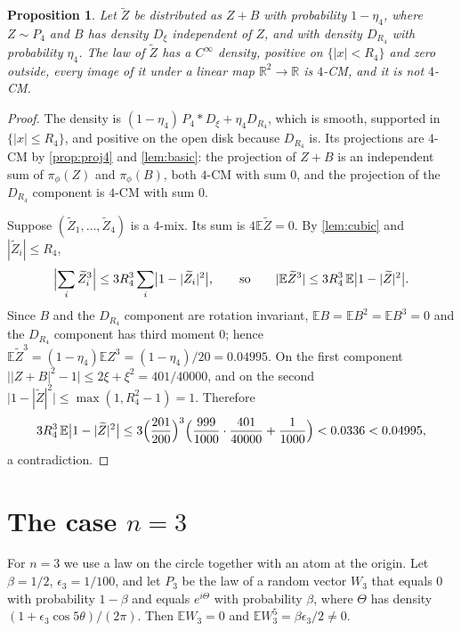 \documentclass[11pt]{article}
\newtheorem{proposition}[theorem]{Proposition}
\theoremstyle{definition}
\theoremstyle{remark}
\newcommand{\R}{\mathbb{R}}
\newcommand{\E}{\mathbb{E}}
\begin{document}
\begin{proposition}\label{prop:disk4}
Let $\widetilde Z$ be distributed as $Z+B$ with probability $1-\eta_4$, where $Z\sim P_4$ and $B$ has density $D_\xi$
independent of $Z$, and with density $D_{R_4}$ with probability $\eta_4$. The law of $\widetilde Z$ has a $C^\infty$ density, positive
on $\{|x|<R_4\}$ and zero outside, every image of it under a linear map $\R^2\to\R$ is $4$-CM, and it is not $4$-CM.
\end{proposition}

\begin{proof}
The density is $(1-\eta_4)\,P_4*D_\xi+\eta_4 D_{R_4}$, which is smooth, supported in $\{|x|\le R_4\}$, and positive on the
open disk because $D_{R_4}$ is. Its projections are $4$-CM by \cref{prop:proj4} and \cref{lem:basic}: the projection of
$Z+B$ is an independent sum of $\pi_\phi(Z)$ and $\pi_\phi(B)$, both $4$-CM with sum $0$, and the projection of the
$D_{R_4}$ component is $4$-CM with sum $0$.

Suppose $(\widetilde Z_1,\dots,\widetilde Z_4)$ is a $4$-mix. Its sum is $4\E \widetilde Z=0$. By \cref{lem:cubic} and $|\widetilde Z_i|\le R_4$,
\[
\Bigl|\sum_i\widetilde Z_i^3\Bigr|\le 3R_4^3\sum_i\bigl|1-|\widetilde Z_i|^2\bigr|,
\qquad\text{so}\qquad |\E \widetilde Z^3|\le 3R_4^3\,\E\bigl|1-|\widetilde Z|^2\bigr| .
\]
Since $B$ and the $D_{R_4}$ component are rotation invariant, $\E B=\E B^2=\E B^3=0$ and the $D_{R_4}$ component has third moment
$0$; hence $\E \widetilde Z^3=(1-\eta_4)\E Z^3=(1-\eta_4)/20=0.04995$. On the first component
$\bigl||Z+B|^2-1\bigr|\le2\xi+\xi^2=401/40000$, and on the second $\bigl|1-|\widetilde Z|^2\bigr|\le\max(1,R_4^2-1)=1$.
Therefore
\[
3R_4^3\,\E\bigl|1-|\widetilde Z|^2\bigr|\le3\Bigl(\frac{201}{200}\Bigr)^3\Bigl(\frac{999}{1000}\cdot\frac{401}{40000}+\frac1{1000}\Bigr)
<0.0336<0.04995,
\]
a contradiction.
\end{proof}

\section{The case \texorpdfstring{$n=3$}{n=3}}\label{sec:three}

For $n=3$ we use a law on the circle together with an atom at the origin. Let
$\beta=1/2$, $\epsilon_3=1/100$, and let $P_3$ be the law of a random vector $W_3$ that equals $0$ with probability
$1-\beta$ and equals $e^{i\Theta}$ with probability $\beta$, where $\Theta$ has density
$(1+\epsilon_3\cos5\theta)/(2\pi)$. Then $\E W_3=0$ and $\E W_3^5=\beta\epsilon_3/2\ne0$.
\end{document}
